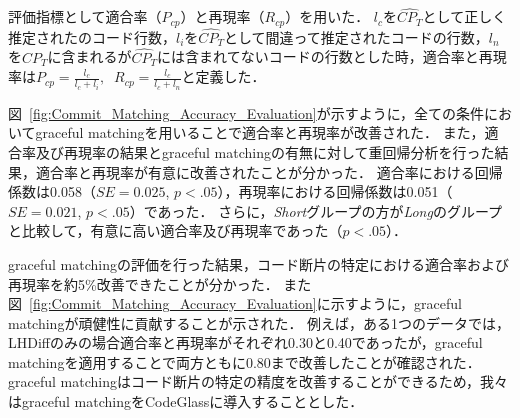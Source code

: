 評価指標として適合率（$P_{cp}$）と再現率（$R_{cp}$）を用いた．
$l_c$を$\widehat{CP_{T}}$として正しく推定されたのコード行数，$l_i$を$\widehat{CP_{T}}$として間違って推定されたコードの行数，$l_n$を$CP_{T}$に含まれるが$\widehat{CP_{T}}$には含まれてないコードの行数とした時，適合率と再現率は$P_{cp} = \frac{l_c}{l_c + l_i},\;\; R_{cp} = \frac{l_c}{l_c + l_n}$と定義した．  


図~\ref{fig:Commit_Matching_Accuracy_Evaluation}が示すように，全ての条件においてgraceful matchingを用いることで適合率と再現率が改善された．
また，適合率及び再現率の結果とgraceful matchingの有無に対して重回帰分析を行った結果，適合率と再現率が有意に改善されたことが分かった．
適合率における回帰係数は0.058（$SE=0.025$, $p<.05$），再現率における回帰係数は0.051（$SE=0.021$, $p<.05$）であった．
さらに，\textit{Short}グループの方が\textit{Long}のグループと比較して，有意に高い適合率及び再現率であった（$p<.05$）．


graceful matchingの評価を行った結果，コード断片の特定における適合率および再現率を約5\%改善できたことが分かった．
また図~\ref{fig:Commit_Matching_Accuracy_Evaluation}に示すように，graceful matchingが頑健性に貢献することが示された．
例えば，ある1つのデータでは，LHDiffのみの場合適合率と再現率がそれぞれ0.30と0.40であったが，graceful matchingを適用することで両方ともに0.80まで改善したことが確認された．
graceful matchingはコード断片の特定の精度を改善することができるため，我々はgraceful matchingをCodeGlassに導入することとした．

